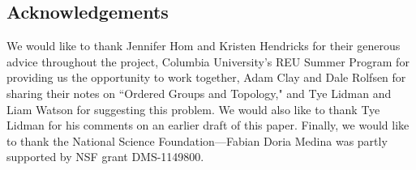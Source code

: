 \subsection{Acknowledgements} We would like to thank Jennifer Hom and Kristen Hendricks for their generous advice throughout the project, Columbia University's REU Summer Program for providing us the opportunity to work together, Adam Clay and Dale Rolfsen for sharing their notes on ``Ordered Groups and Topology," and Tye Lidman and Liam Watson for suggesting this problem. We would also like to thank Tye Lidman for his comments on an earlier draft of this paper. Finally, we would like to thank the National Science Foundation---Fabian Doria Medina was partly supported by NSF grant DMS-1149800.